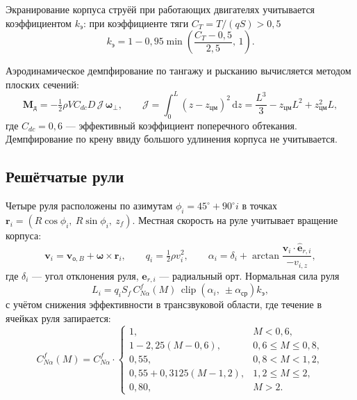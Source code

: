 \documentclass[11pt,a4paper]{article}
\newcommand{\vect}[1]{\bm{#1}}
\newcommand{\dd}{\mathrm{d}}
\begin{document}
Экранирование корпуса струёй при работающих двигателях учитывается
коэффициентом $k_{\text{э}}$: при коэффициенте тяги $C_T=T/(qS)>0{,}5$
\begin{equation}
k_{\text{э}} = 1 - 0{,}95\min\!\left(\frac{C_T-0{,}5}{2{,}5},\,1\right).
\end{equation}

Аэродинамическое демпфирование по тангажу и рысканию вычисляется методом плоских
сечений:
\begin{equation}
\vect{M}_{\text{д}} = -\tfrac12\rho V C_{dc} D\, \mathcal{J}\,
 \boldsymbol{\omega}_\perp,
\qquad
\mathcal{J}=\int_0^L (z-z_{\text{цм}})^2\,\dd z
 = \frac{L^3}{3}-z_{\text{цм}}L^2+z_{\text{цм}}^2 L,
\end{equation}
где $C_{dc}=0{,}6$ — эффективный коэффициент поперечного обтекания.
Демпфирование по крену ввиду большого удлинения корпуса не учитывается.

\subsection{Решётчатые рули}

Четыре руля расположены по азимутам $\phi_i=45^\circ+90^\circ i$ в точках
$\vect{r}_i=\left(R\cos\phi_i,\ R\sin\phi_i,\ z_f\right)$. Местная скорость на
руле учитывает вращение корпуса:
\begin{equation}
\vect{v}_i = \vect{v}_{\text{о},B} + \boldsymbol{\omega}\times\vect{r}_i,
\qquad
q_i=\tfrac12\rho v_i^2,
\qquad
\alpha_i = \delta_i
 + \arctan\frac{\vect{v}_i\cdot\hat{\vect{e}}_{r,i}}{-v_{i,z}},
\end{equation}
где $\delta_i$ — угол отклонения руля, $\hat{\vect{e}}_{r,i}$ — радиальный орт.
Нормальная сила руля
\begin{equation}
L_i = q_i S_f\, C_{N\alpha}^f(M)\,
 \operatorname{clip}\left(\alpha_i,\ \pm\alpha_{\text{ср}}\right) k_{\text{э}},
\end{equation}
с учётом снижения эффективности в трансзвуковой области, где течение в ячейках
руля запирается:
\begin{equation}
C_{N\alpha}^f(M)=C_{N\alpha}^f\cdot
\begin{cases}
1, & M<0{,}6,\\
1-2{,}25\left(M-0{,}6\right), & 0{,}6\le M\le0{,}8,\\
0{,}55, & 0{,}8<M<1{,}2,\\
0{,}55+0{,}3125\left(M-1{,}2\right), & 1{,}2\le M\le 2,\\
0{,}80, & M>2 .
\end{cases}
\end{equation}
\end{document}
